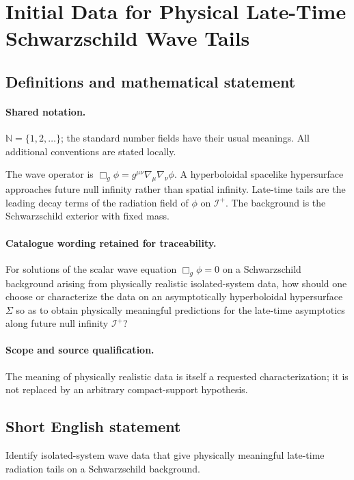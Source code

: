 \documentclass[11pt]{article}
\begin{document}
\section{Initial Data for Physical Late-Time Schwarzschild Wave Tails}\label{statement}

\subsection{Definitions and mathematical statement}

\paragraph{Shared notation.}$\mathbb N=\{1,2,\ldots\}$; the standard number fields have their usual meanings. All additional conventions are stated locally.


The wave operator is $\Box_g\phi=g^{\mu\nu}\nabla_\mu\nabla_\nu\phi$. A hyperboloidal spacelike hypersurface approaches future null infinity rather than spatial infinity. Late-time tails are the leading decay terms of the radiation field of $\phi$ on $\mathcal I^+$. The background is the Schwarzschild exterior with fixed mass.

\paragraph{Catalogue wording retained for traceability.}
For solutions of the scalar wave equation $\Box_g\phi=0$ on a Schwarzschild background arising from physically realistic isolated-system data, how should one choose or characterize the data on an asymptotically hyperboloidal hypersurface $\Sigma$ so as to obtain physically meaningful predictions for the late-time asymptotics along future null infinity $\mathcal{I}^+$?

\paragraph{Scope and source qualification.}The meaning of physically realistic data is itself a requested characterization; it is not replaced by an arbitrary compact-support hypothesis.
\subsection{Short English statement}
Identify isolated-system wave data that give physically meaningful late-time radiation tails on a Schwarzschild background.
\end{document}
